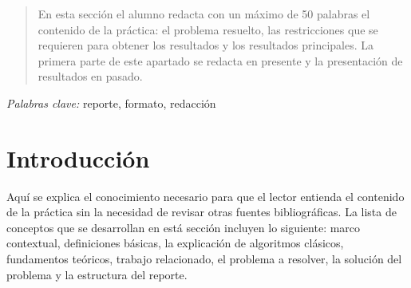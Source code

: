 \documentclass[12pt]{article}
\begin{document}
\maketitle %


\begin{abstract}
En esta sección el alumno redacta con un máximo de 50 palabras el contenido de 
la práctica: el problema resuelto, las restricciones que se requieren para 
obtener los resultados y los resultados principales. La primera parte de este 
apartado se redacta en presente y la presentación de resultados en pasado.
\end{abstract}

\hspace*{3,6mm}\textit{Palabras clave:} reporte, formato, redacción%

\vspace{30pt} %


\section{Introducción}

Aquí se explica el conocimiento necesario para que el lector entienda el 
contenido de la práctica sin la necesidad de revisar otras fuentes 
bibliográficas. La lista de conceptos que se desarrollan en está sección 
incluyen lo siguiente: marco contextual, definiciones básicas, la explicación 
de algoritmos clásicos, fundamentos teóricos, trabajo relacionado, el problema 
a resolver, la solución del problema y la estructura del reporte.
\end{document}
